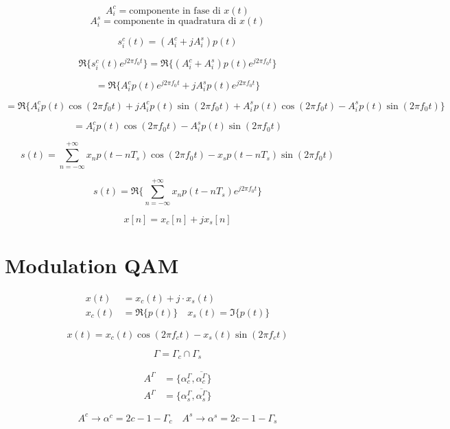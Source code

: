 \documentclass{article}
\begin{document}
\[
A^c_i = \text{componente in fase di } x(t)
\]
\[
A^s_i = \text{componente in quadratura di } x(t)
\]

\[
s^c_i(t) = (A^c_i + j A^s_i) p(t)
\]

\[
\Re\{s^c_i(t) e^{j2\pi f_0t}\} = \Re\{(A^c_i + A^s_i) p(t) e^{j2\pi f_0t}\}
\]

\[
= \Re\{A^c_i p(t) e^{j2\pi f_0t} + j A^s_i p(t) e^{j2\pi f_0t}\}
\]

\[
= \Re\{A^c_i p(t) \cos(2\pi f_0t) + j A^c_i p(t) \sin(2\pi f_0t) + A^s_i p(t) \cos(2\pi f_0t) - A^s_i p(t) \sin(2\pi f_0t)\}
\]

\[
= A^c_i p(t) \cos(2\pi f_0t) - A^s_i p(t) \sin(2\pi f_0t)
\]

\[
s(t) = \sum_{n=-\infty}^{+\infty} x_n p(t-nT_s) \cos(2\pi f_0t) - x_s p(t-nT_s) \sin(2\pi f_0t)
\]

\[
s(t) = \Re\{\sum_{n=-\infty}^{+\infty} x_n p(t-nT_s)e^{j2\pi f_0 t}\}
\]

\[
    x[n] = x_c[n] + jx_s[n]
\]


\section*{Modulation QAM}

\begin{align*}
x(t) &= x_c(t) + j \cdot x_s(t) \\
x_c(t) &= \Re\{p(t)\} \quad x_s(t) = \Im\{p(t)\}
\end{align*}

\begin{tikzpicture}
\end{tikzpicture}

\[
x(t) = x_c(t) \cos(2\pi f_ct) - x_s(t) \sin(2\pi f_ct)
\]


\[
\Gamma = \Gamma_c \cap \Gamma_s
\]

\begin{align*}
A^\Gamma &= \{\alpha^\Gamma_c, \overline{\alpha^\Gamma_c}\} \\
A^\Gamma &= \{\alpha^\Gamma_s, \overline{\alpha^\Gamma_s}\}
\end{align*}

\[
A^c \rightarrow \alpha^c = 2c - 1 - \Gamma_c \quad A^s \rightarrow \alpha^s = 2c - 1 - \Gamma_s
\]
\end{document}
